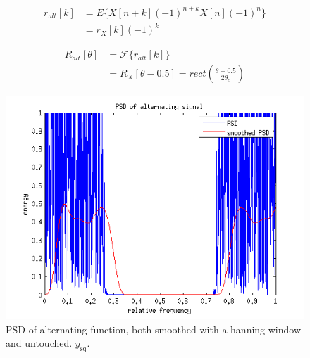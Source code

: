 \documentclass[10pt]{article}
\begin{document}
\begin{align*}
r_{alt}[k] & = E\{X[n+k](-1)^{n+k}X[n](-1)^n\} \\
& =r_X[k](-1)^k
\end{align*}

\begin{align*}
R_{alt}[\theta] & = \mathcal{F}\{r_{alt}[k]\} \nonumber \\
& = R_X[\theta-0.5] = rect(\frac{\theta-0.5}{2\theta_c})
\end{align*}



\begin{figure}[!hp]
    \begin{center}
      \includegraphics[width=1\textwidth]{ideal_periodogram_hanning_alternating}
    \caption{PSD of alternating function, both smoothed with a hanning window and untouched. $y_\text{sq}$. \label{fig:TheoACFsimple}}
    \end{center}
\end{figure}
\end{document}
